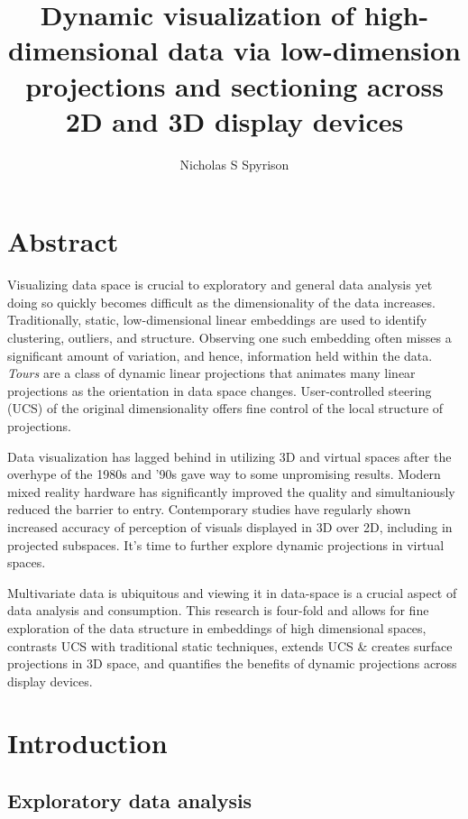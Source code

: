 \documentclass{monashthesis}
\author{Nicholas S Spyrison}
\title{Dynamic visualization of high-dimensional data via low-dimension
projections and sectioning across 2D and 3D display devices}
\begin{document}

\titlepage

{\sf\tighttoc\doublespacing}

\chapter*{Abstract}\label{abstract}

Visualizing data space is crucial to exploratory and general data
analysis yet doing so quickly becomes difficult as the dimensionality of
the data increases. Traditionally, static, low-dimensional linear
embeddings are used to identify clustering, outliers, and structure.
Observing one such embedding often misses a significant amount of
variation, and hence, information held within the data. \emph{Tours} are
a class of dynamic linear projections that animates many linear
projections as the orientation in data space changes. User-controlled
steering (UCS) of the original dimensionality offers fine control of the
local structure of projections.

Data visualization has lagged behind in utilizing 3D and virtual spaces
after the overhype of the 1980s and '90s gave way to some unpromising
results. Modern mixed reality hardware has significantly improved the
quality and simultaniously reduced the barrier to entry. Contemporary
studies have regularly shown increased accuracy of perception of visuals
displayed in 3D over 2D, including in projected subspaces. It's time to
further explore dynamic projections in virtual spaces.

Multivariate data is ubiquitous and viewing it in data-space is a
crucial aspect of data analysis and consumption. This research is
four-fold and allows for fine exploration of the data structure in
embeddings of high dimensional spaces, contrasts UCS with traditional
static techniques, extends UCS \& creates surface projections in 3D
space, and quantifies the benefits of dynamic projections across display
devices.

\clearpage{}\setcounter{page}{0}

\chapter{Introduction}\label{ch:introduction}

\section{Exploratory data analysis}\label{exploratory-data-analysis}
\end{document}
